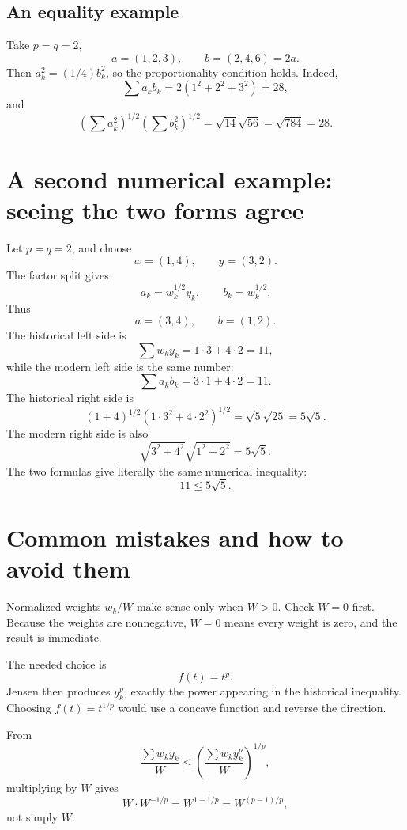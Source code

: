 \documentclass[11pt]{article}
\begin{document}
\subsection{An equality example}

Take \(p=q=2\),
\[
 a=(1,2,3),
 \qquad
 b=(2,4,6)=2a.
\]
Then \(a_k^2=(1/4)b_k^2\), so the proportionality condition holds. Indeed,
\[
 \sum a_kb_k=2(1^2+2^2+3^2)=28,
\]
and
\[
 \left(\sum a_k^2\right)^{1/2}
 \left(\sum b_k^2\right)^{1/2}
 =\sqrt{14}\sqrt{56}=\sqrt{784}=28.
\]

\section{A second numerical example: seeing the two forms agree}

Let \(p=q=2\), and choose
\[
 w=(1,4),
 \qquad
 y=(3,2).
\]
The factor split gives
\[
 a_k=w_k^{1/2}y_k,
 \qquad
 b_k=w_k^{1/2}.
\]
Thus
\[
 a=(3,4),
 \qquad
 b=(1,2).
\]
The historical left side is
\[
 \sum w_ky_k=1\cdot3+4\cdot2=11,
\]
while the modern left side is the same number:
\[
 \sum a_kb_k=3\cdot1+4\cdot2=11.
\]
The historical right side is
\[
 (1+4)^{1/2}(1\cdot3^2+4\cdot2^2)^{1/2}
 =\sqrt5\sqrt{25}=5\sqrt5.
\]
The modern right side is also
\[
 \sqrt{3^2+4^2}\sqrt{1^2+2^2}
 =5\sqrt5.
\]
The two formulas give literally the same numerical inequality:
\[
 11\leq5\sqrt5.
\]

\section{Common mistakes and how to avoid them}

\begin{warningBox}[Mistake 1: forgetting the case \(\sum w_k=0\)]
Normalized weights \(w_k/W\) make sense only when \(W>0\). Check \(W=0\) first. Because the weights are nonnegative, \(W=0\) means every weight is zero, and the result is immediate.
\end{warningBox}

\begin{warningBox}
The needed choice is
\[
 f(t)=t^p.
\]
Jensen then produces \(y_k^p\), exactly the power appearing in the historical inequality. Choosing \(f(t)=t^{1/p}\) would use a concave function and reverse the direction.
\end{warningBox}

\begin{warningBox}
From
\[
 \frac{\sum w_ky_k}{W}
 \leq
 \left(\frac{\sum w_ky_k^p}{W}\right)^{1/p},
\]
multiplying by \(W\) gives
\[
 W\cdot W^{-1/p}=W^{1-1/p}=W^{(p-1)/p},
\]
not simply \(W\).
\end{warningBox}
\end{document}
